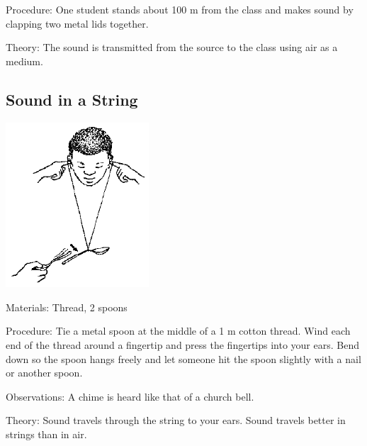 \begin{multicols}{2}
\begin{description*}
\item[Procedure:]{One student stands about 100 m from the class and makes sound by clapping two metal lids together.}
\item[Theory:]{The sound is transmitted from the source to the class using air as a medium.}
\end{description*}

\subsection{Sound in a String}

\begin{center}
\includegraphics[width=0.4\textwidth]{./img/source/sound-in-string.png}
\end{center}

\begin{description*}
\item[Materials:]{Thread, 2 spoons}
\item[Procedure:]{Tie a metal spoon at the middle of a 1 m cotton thread. Wind each end of the thread around a fingertip and press the fingertips into your ears. Bend down so the spoon hangs freely and let someone hit the spoon slightly with a nail or another spoon.}
\item[Observations:]{A chime is heard like that of a church bell.}
\item[Theory:]{Sound travels through the string to your ears. Sound travels better in strings than in air.}
\end{description*}


\end{multicols}

